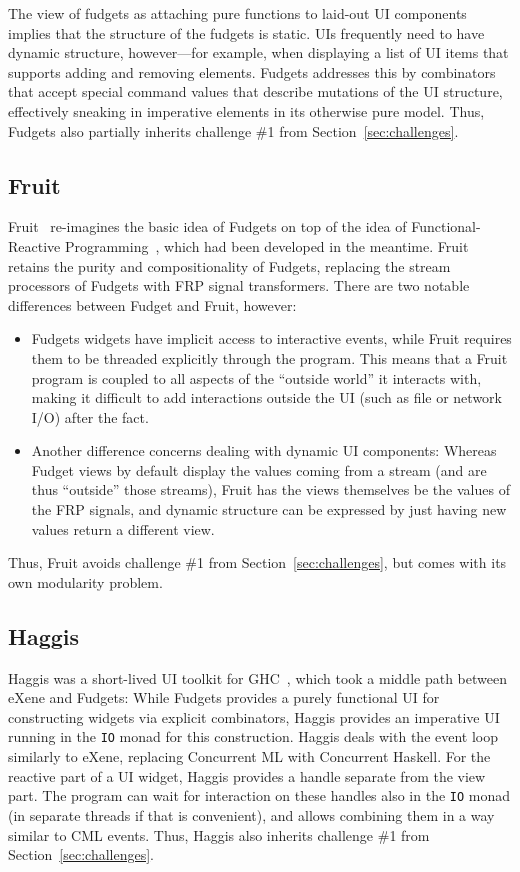 \documentclass[sigplan,review,screen]{acmart}
\begin{document}
The view of fudgets as attaching pure functions to laid-out UI
components implies that the structure of the fudgets is static.  UIs
frequently need to have dynamic structure, however---for example, when
displaying a list of UI items that supports adding and removing
elements.  Fudgets addresses this by combinators that accept special
command values that describe mutations of the UI structure,
effectively sneaking in imperative elements in its otherwise pure
model.  Thus, Fudgets also partially inherits challenge \#1 from
Section~\ref{sec:challenges}.

\subsection{Fruit}

Fruit~\cite{Fruit} re-imagines the basic idea of Fudgets on top of the
idea of Functional-Reactive Programming~\cite{FRP}, which had been
developed in the meantime.  Fruit retains the purity and
compositionality of Fudgets,  replacing the stream processors of
Fudgets with FRP signal transformers.  There are two notable
differences between Fudget and Fruit, however:
\begin{itemize}
\item Fudgets widgets have implicit access to interactive events,
  while Fruit requires them to be threaded explicitly through the
  program.  This means that a Fruit program is coupled to all aspects
  of the ``outside world'' it interacts with, making it difficult to
  add interactions outside the UI (such as file or network I/O) after
  the fact.
\item Another difference concerns dealing with dynamic UI components:
  Whereas Fudget views by default display the values coming from a
  stream (and are thus ``outside'' those streams), Fruit has the views
  themselves be the values of the FRP signals, and dynamic structure
  can be expressed by just having new values return a different view.
\end{itemize}
%
Thus, Fruit avoids challenge \#1 from Section~\ref{sec:challenges},
but comes with its own modularity problem.

\subsection{Haggis}

Haggis was a short-lived UI toolkit for GHC~\cite{Haggis}, which took
a middle path between eXene and Fudgets: While Fudgets
provides a purely functional UI for constructing widgets via explicit
combinators, Haggis provides an imperative UI running in the
\texttt{IO} monad for this construction.  Haggis deals with the event
loop similarly to eXene, replacing Concurrent ML with Concurrent
Haskell.  For the reactive part of a UI widget, Haggis provides a
handle separate from the view part.  The program can wait for
interaction on these handles also in the \texttt{IO} monad (in
separate threads if that is convenient), and allows combining them in
a way similar to CML events.  Thus, Haggis also inherits challenge
\#1 from Section~\ref{sec:challenges}.
\end{document}
